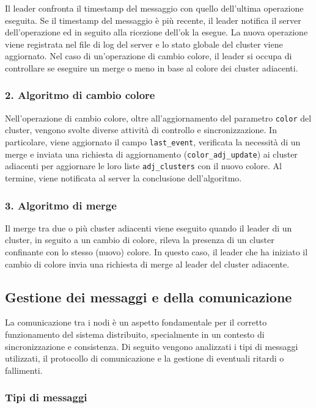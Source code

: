 \documentclass[12pt, a4paper]{report}
\begin{document}
Il leader confronta il timestamp del messaggio con quello dell'ultima operazione eseguita. Se il timestamp del messaggio \`e pi\`u recente, il leader notifica il server dell'operazione ed in seguito alla ricezione dell'ok la esegue. La nuova operazione viene registrata nel file di log del server e lo stato globale del cluster viene aggiornato. Nel caso di un'operazione di cambio colore, il leader si occupa di controllare se eseguire un merge o meno in base al colore dei cluster adiacenti.

\subsubsection{2. Algoritmo di cambio colore}
\label{subsec:change_color}
Nell'operazione di cambio colore, oltre all'aggiornamento del parametro \texttt{color} del cluster, vengono svolte diverse attività di controllo e sincronizzazione. In particolare, viene aggiornato il campo \texttt{last\_event}, verificata la necessità di un merge e inviata una richiesta di aggiornamento (\texttt{color\_adj\_update}) ai cluster adiacenti per aggiornare le loro liste \texttt{adj\_clusters} con il nuovo colore. Al termine, viene notificata al server la conclusione dell'algoritmo.


\subsubsection{3. Algoritmo di merge}
\label{subsec:merge}
Il merge tra due o più cluster adiacenti viene eseguito quando il leader di un cluster, in seguito a un cambio di colore, rileva la presenza di un cluster confinante con lo stesso (nuovo) colore. In questo caso, il leader che ha iniziato il cambio di colore invia una richiesta di merge al leader del cluster adiacente.


\subsection{Gestione dei messaggi e della comunicazione}\label{sec:gestione_messaggi}

La comunicazione tra i nodi \`e un aspetto fondamentale per il corretto funzionamento del sistema distribuito, specialmente in un contesto di sincronizzazione e consistenza. Di seguito vengono analizzati i tipi di messaggi utilizzati, il protocollo di comunicazione e la gestione di eventuali ritardi o fallimenti.

\newpage
\subsubsection{Tipi di messaggi}
\label{sec:tipi_di_messaggi}
\end{document}
